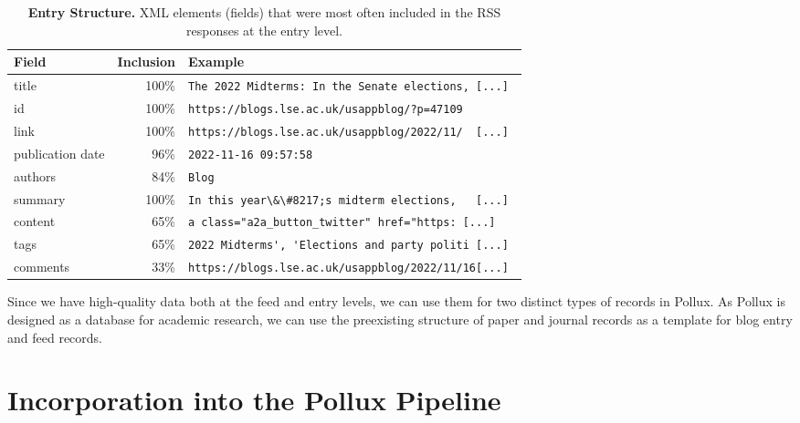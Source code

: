 \documentclass{article}
\begin{document}
\begin{table}[htb]
    \caption{\textbf{Entry Structure.} XML elements (fields) that were most often included in the RSS responses at the entry level.}
    \centering
    \begin{tabular}{lrl}
        \toprule
        \cmidrule(r){1-2}
        \textbf{Field}   & \textbf{Inclusion} & \textbf{Example}                                          \\
        \midrule
        title            & 100\%              & \verb|The 2022 Midterms: In the Senate elections, [...] | \\
        id               & 100\%              & \verb|https://blogs.lse.ac.uk/usappblog/?p=47109        | \\
        link             & 100\%              & \verb|https://blogs.lse.ac.uk/usappblog/2022/11/  [...] | \\
        publication date & 96\%               & \verb|2022-11-16 09:57:58|                                \\
        authors          & 84\%               & \verb|Blog|                                               \\
        summary          & 100\%              & \verb|In this year\&\#8217;s midterm elections,   [...] | \\
        content          & 65\%               & \verb|a class="a2a_button_twitter" href="https: [...] |   \\
        tags             & 65\%               & \verb|2022 Midterms', 'Elections and party politi [...] | \\
        comments         & 33\%               & \verb|https://blogs.lse.ac.uk/usappblog/2022/11/16[...] | \\
        \bottomrule
    \end{tabular}
    \label{tab:entry_structure}
\end{table}

Since we have high-quality data both at the feed and entry levels, we can use them for two distinct types of records in Pollux. As Pollux is designed as a database for academic research, we can use the preexisting structure of paper and journal records as a template for blog entry and feed records.

\section{Incorporation into the Pollux Pipeline}\label{sec:incorporation}
\end{document}
